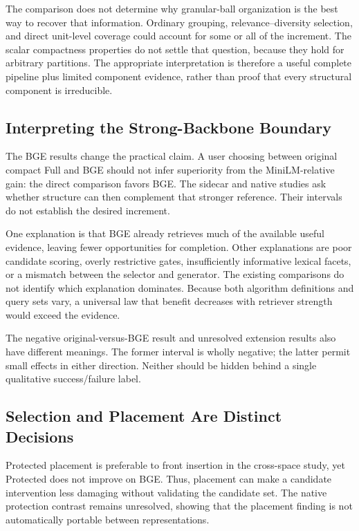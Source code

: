 \documentclass[11pt,a4paper]{article}
\begin{document}
The comparison does not determine why granular-ball organization is the best
way to recover that information. Ordinary grouping, relevance--diversity
selection, and direct unit-level coverage could account for some or all of
the increment. The scalar compactness properties do not settle that
question, because they hold for arbitrary partitions. The appropriate
interpretation is therefore a useful complete pipeline plus limited
component evidence, rather than proof that every structural component is
irreducible.

\subsection{Interpreting the Strong-Backbone Boundary}
The BGE results change the practical claim. A user choosing between original
compact Full and BGE should not infer superiority from the MiniLM-relative
gain: the direct comparison favors BGE. The sidecar and native studies ask
whether structure can then complement that stronger reference. Their
intervals do not establish the desired increment.

One explanation is that BGE already retrieves much of the available useful
evidence, leaving fewer opportunities for completion. Other explanations are
poor candidate scoring, overly restrictive gates, insufficiently informative
lexical facets, or a mismatch between the selector and generator.
The existing comparisons do not identify which explanation dominates.
Because both algorithm definitions and query sets vary, a universal law that
benefit decreases with retriever strength would exceed the evidence.

The negative original-versus-BGE result and unresolved extension results
also have different meanings. The former interval is wholly negative; the
latter permit small effects in either direction. Neither should be hidden
behind a single qualitative success/failure label.

\subsection{Selection and Placement Are Distinct Decisions}
Protected placement is preferable to front insertion in the cross-space
study, yet Protected does not improve on BGE. Thus, placement can make a
candidate intervention less damaging without validating the candidate set.
The native protection contrast remains unresolved, showing that the placement
finding is not automatically portable between representations.
\end{document}
